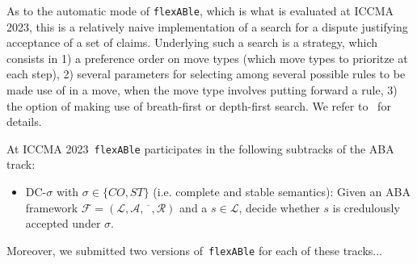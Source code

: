 \documentclass[conference]{IEEEtran}
\newcommand{\flexable}{\texttt{flexABle}\xspace}
\newcommand{\iccma}{ICCMA 2023}
\newcommand{\frF}{\ensuremath{\mathcal{F}}\xspace}
\newcommand{\frL}{\ensuremath{\mathcal{L}}\xspace}
\newcommand{\frA}{\ensuremath{\mathcal{A}}\xspace}
\newcommand{\frCtr}{\ensuremath{\overline{\phantom{x}}}\xspace}
\newcommand{\frR}{\ensuremath{\mathcal{R}}\xspace}
\newcommand{\frTup}{\ensuremath{(\frL,\frA,\frCtr,\frR)}\xspace}
\newcommand{\fr}{\ensuremath{\frF = \frTup}\xspace}
\begin{document}
As to the automatic mode of \flexable, which is what is evaluated at \iccma, this is a relatively naive implementation of a search for a dispute justifying acceptance of a set of claims.  Underlying such a search is a strategy, which consists in 1) a preference order on move types (which move types to prioritze at each step), 2) several parameters for selecting among several possible rules to be made use of in a move, when the move type involves putting forward a rule, 3) the option of making use of breath-first or depth-first search.  We refer to~\cite{DiGaGo22,gor22} for details.

At \iccma~\flexable participates in the following subtracks of the ABA track:

\begin{itemize}
\item DC-$\sigma$ with $\sigma \in \{CO, ST\}$ (i.e. complete and stable semantics): Given an ABA framework \fr and a $s \in \frL$, decide whether $s$ is credulously accepted under $\sigma$.
\end{itemize}

\noindent Moreover, we submitted two versions of~\flexable for each of these tracks... 

 









%
%
\end{document}
